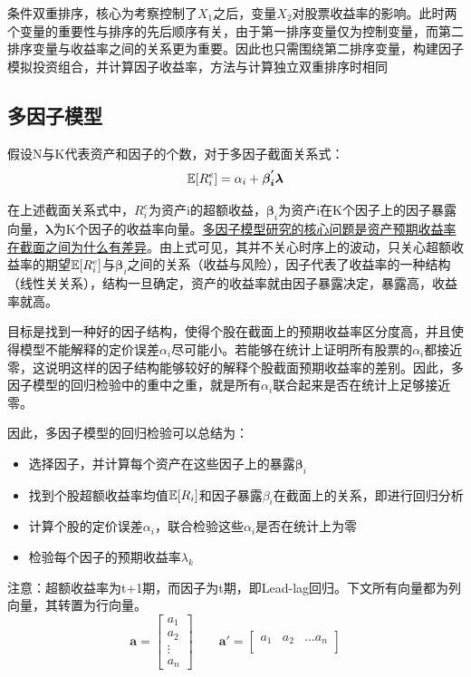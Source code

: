 \documentclass[11pt]{article}
\begin{document}
条件双重排序，核心为考察控制了$X_1$之后，变量$X_2$对股票收益率的影响。此时两个变量的重要性与排序的先后顺序有关，由于第一排序变量仅为控制变量，而第二排序变量与收益率之间的关系更为重要。因此也只需围绕第二排序变量，构建因子模拟投资组合，并计算因子收益率，方法与计算独立双重排序时相同

\subsection{多因子模型}

假设N与K代表资产和因子的个数，对于多因子截面关系式：
\begin{equation*}
    \mathbb{E}[R_{i}^{e}] = \alpha_i + \bm{\beta_{i}^{'} \lambda}
\end{equation*}

在上述截面关系式中，$R_{i}^{e}$为资产i的超额收益，$\bm{\beta}_i$为资产i在K个因子上的因子暴露向量，$\bm{\lambda}$为K个因子的收益率向量。\uline{多因子模型研究的核心问题是资产预期收益率在截面之间为什么有差异}。由上式可见，其并不关心时序上的波动，只关心超额收益率的期望$\mathbb{E}[R_{i}^{e}]$与$\bm{\beta}_i$之间的关系（收益与风险），因子代表了收益率的一种结构（线性关关系），结构一旦确定，资产的收益率就由因子暴露决定，暴露高，收益率就高。

目标是找到一种好的因子结构，使得个股在截面上的预期收益率区分度高，并且使得模型不能解释的定价误差$\alpha_i$尽可能小。若能够在统计上证明所有股票的$\alpha_i$都接近零，这说明这样的因子结构能够较好的解释个股截面预期收益率的差别。因此，多因子模型的回归检验中的重中之重，就是所有$\alpha_i$联合起来是否在统计上足够接近零。

因此，多因子模型的回归检验可以总结为：
\begin{itemize}
    \item 选择因子，并计算每个资产在这些因子上的暴露$\bm{\beta}_i$
    \item 找到个股超额收益率均值$\mathbb{E}[R_{i}]$和因子暴露$\beta_i$在截面上的关系，即进行回归分析
    \item 计算个股的定价误差$\alpha_i$，联合检验这些$\alpha_i$是否在统计上为零
    \item 检验每个因子的预期收益率$\lambda_k$
\end{itemize}

注意：超额收益率为t+1期，而因子为t期，即Lead-lag回归。下文所有向量都为列向量，其转置为行向量。
\begin{equation*}
    \bm{a} = \begin{bmatrix}
        a_1 \\
        a_2 \\
        \vdots \\
        a_n
    \end{bmatrix}
    \qquad
    \bm{a}' = \begin{bmatrix}
        a_1 & a_2 & \dots a_n \\
    \end{bmatrix}
\end{equation*}
\end{document}
